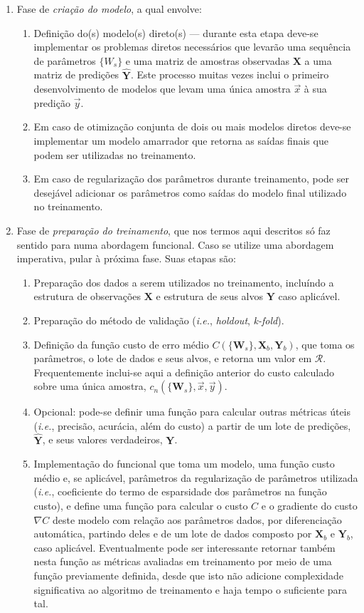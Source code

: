     \begin{enumerate}
      \item Fase de \emph{criação do modelo}, a qual envolve:
        \begin{enumerate}
          \item Definição do(s) modelo(s) direto(s) --- durante esta etapa deve-se implementar os problemas diretos necessários que levarão uma sequência de parâmetros $\{W_s\}$ e uma matriz de amostras observadas $\boldsymbol{X}$ a uma matriz de predições $\boldsymbol{\hat{Y}}$. Este processo muitas vezes inclui o primeiro desenvolvimento de modelos que levam uma única amostra $\vec{x}$ à sua predição $\vec{y}$.
          \item Em caso de otimização conjunta de dois ou mais modelos diretos deve-se implementar um modelo amarrador que retorna as saídas finais que podem ser utilizadas no treinamento.
          \item Em caso de regularização dos parâmetros durante treinamento, pode ser desejável adicionar os parâmetros como saídas do modelo final utilizado no treinamento.
        \end{enumerate}
      \item Fase de \emph{preparação do treinamento}, que nos termos aqui descritos só faz sentido para numa abordagem funcional. Caso se utilize uma abordagem imperativa, pular à próxima fase. Suas etapas são:
        \begin{enumerate}
          \item Preparação dos dados a serem utilizados no treinamento, incluíndo a estrutura de observações $\boldsymbol{X}$ e estrutura de seus alvos $\boldsymbol{Y}$ caso aplicável.
          \item Preparação do método de validação (\textit{i.e.}, \textit{holdout}, \textit{k-fold}).
          \item Definição da função custo de erro médio $C(\{\boldsymbol{W}_s\}, \boldsymbol{X}_b, \boldsymbol{Y}_b)$, que toma os parâmetros, o lote de dados e seus alvos, e retorna um valor em $\mathcal{R}$. Frequentemente inclui-se aqui a definição anterior do custo calculado sobre uma única amostra, $c_n(\{\boldsymbol{W}_s\}, \vec{x}, \vec{y})$.
          \item Opcional: pode-se definir uma função para calcular outras métricas úteis (\textit{i.e.}, precisão, acurácia, além do custo) a partir de um lote de predições, $\boldsymbol{\hat{Y}}$, e seus valores verdadeiros, $\boldsymbol{Y}$.
          \item Implementação do funcional que toma um modelo, uma função custo médio e, se aplicável, parâmetros da regularização de parâmetros utilizada (\textit{i.e.}, coeficiente do termo de esparsidade dos parâmetros na função custo), e define uma função para calcular o custo $C$ e o gradiente do custo $\nabla C$ deste modelo com relação aos parâmetros dados, por diferenciação automática, partindo deles e de um lote de dados composto por $\boldsymbol{X}_b$ e $\boldsymbol{Y}_b$, caso aplicável. Eventualmente pode ser interessante retornar também nesta função as métricas avaliadas em treinamento por meio de uma função previamente definida, desde que isto não adicione complexidade significativa ao algoritmo de treinamento e haja tempo o suficiente para tal.

\end{enumerate}
\end{enumerate}
